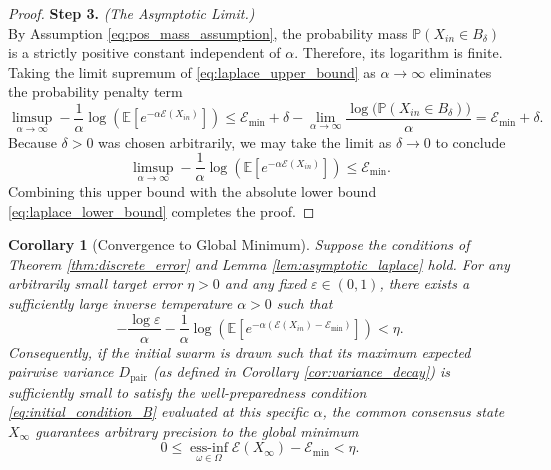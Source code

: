 \documentclass[12pt]{amsart}
\DeclareMathOperator*{\essinf}{ess-inf}
\numberwithin{equation}{section}
\newtheorem{corollary}[theorem]{Corollary}
\begin{document}
\begin{proof}
\textbf{Step 3.} \textit{(The Asymptotic Limit.)} \\
By Assumption \eqref{eq:pos_mass_assumption}, the probability mass $\mathbb{P}(X_{in} \in B_\delta)$ is a strictly positive constant independent of $\alpha$. Therefore, its logarithm is finite. Taking the limit supremum of \eqref{eq:laplace_upper_bound} as $\alpha \to \infty$ eliminates the probability penalty term
\begin{equation*}
    \limsup_{\alpha \to \infty} -\frac{1}{\alpha} \log \left( \mathbb{E} \left[ e^{-\alpha \mathscr{E}(X_{in})} \right] \right) \le \mathscr{E}_{\min} + \delta - \lim_{\alpha \to \infty} \frac{\log \big( \mathbb{P}(X_{in} \in B_\delta) \big)}{\alpha} = \mathscr{E}_{\min} + \delta.
\end{equation*}
Because $\delta > 0$ was chosen arbitrarily, we may take the limit as $\delta \to 0$ to conclude
\begin{equation*}
    \limsup_{\alpha \to \infty} -\frac{1}{\alpha} \log \left( \mathbb{E} \left[ e^{-\alpha \mathscr{E}(X_{in})} \right] \right) \le \mathscr{E}_{\min}.
\end{equation*}
Combining this upper bound with the absolute lower bound \eqref{eq:laplace_lower_bound} completes the proof.
\end{proof}


\begin{corollary}[Convergence to Global Minimum] \label{cor:asymptotic_convergence}
Suppose the conditions of Theorem \ref{thm:discrete_error} and Lemma \ref{lem:asymptotic_laplace} hold. For any arbitrarily small target error $\eta > 0$ and any fixed $\varepsilon \in (0, 1)$, there exists a sufficiently large inverse temperature $\alpha > 0$ such that 
\begin{equation} \label{eq:upper_bound_eta}
    - \frac{\log \varepsilon}{\alpha} - \frac{1}{\alpha} \log \left( \mathbb{E} \left[ e^{-\alpha (\mathscr{E}(X_{in}) - \mathscr{E}_{\min})} \right] \right) < \eta.
\end{equation}
Consequently, if the initial swarm is drawn such that its maximum expected pairwise variance $D_{\text{pair}}$ (as defined in Corollary \ref{cor:variance_decay}) is sufficiently small to satisfy the well-preparedness condition \eqref{eq:initial_condition_B} evaluated at this specific $\alpha$, the common consensus state $X_\infty$ guarantees arbitrary precision to the global minimum
\begin{equation}
    0 \le  \essinf\limits_{\omega \in \Omega} \mathscr{E}(X_\infty) - \mathscr{E}_{\min} < \eta.
\end{equation}
\end{corollary}
\end{document}
